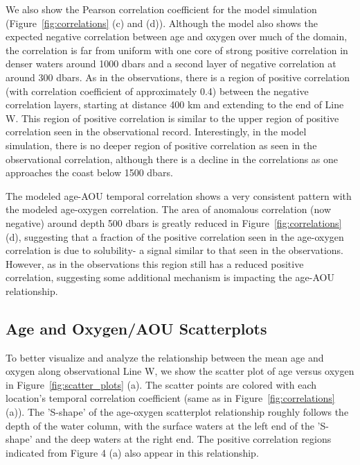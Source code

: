 We also show the Pearson correlation coefficient for the model simulation
(Figure~\ref{fig:correlations} (c) and (d)). Although the model also shows the
expected negative correlation between age and oxygen over much of the domain,
the correlation is far from uniform with one core of strong positive correlation
in denser waters around 1000 dbars and a second layer of negative correlation at
around 300 dbars.  As in the observations, there is a region of positive correlation
(with correlation coefficient of approximately 0.4) between the negative correlation
layers, starting at distance 400 km and extending to the end of Line W. This region
of positive correlation is similar to the upper region of positive correlation seen
in the observational record. Interestingly, in the model simulation, there is no
deeper region of positive correlation as seen in the observational correlation,
although there is a decline in the correlations as one approaches the coast below
1500 dbars.

The modeled age-AOU temporal correlation shows a very consistent pattern with the
modeled age-oxygen correlation. The area of anomalous correlation (now negative)
around depth 500 dbars is greatly reduced in Figure~\ref{fig:correlations} (d),
suggesting that a fraction of the positive correlation seen in the age-oxygen
correlation is due to solubility- a signal similar to that seen in the observations.
However, as in the observations this region still has a reduced positive correlation,
suggesting some additional mechanism is impacting the age-AOU relationship.

\subsection{Age and Oxygen/AOU Scatterplots}

To better visualize and analyze the relationship between the mean age and oxygen
along observational Line W, we show the scatter plot of age versus oxygen in
Figure~\ref{fig:scatter_plots} (a). The scatter points are colored with each
location's temporal correlation coefficient (same as in Figure~\ref{fig:correlations}
(a)). The 'S-shape' of the age-oxygen scatterplot relationship roughly follows
the depth of the water column, with the surface waters at the left end of the
'S-shape' and the deep waters at the right end. The positive correlation regions
indicated from Figure 4 (a) also appear in this relationship.

